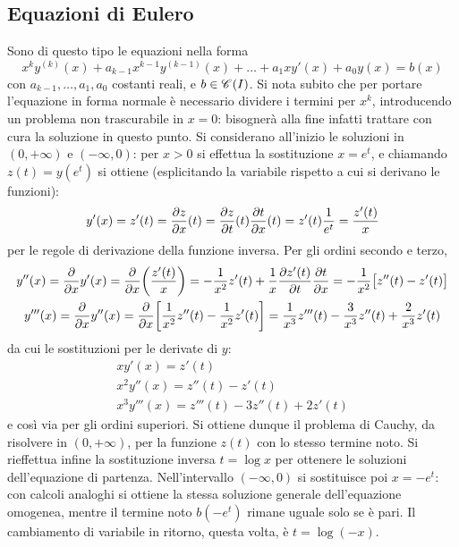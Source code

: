 \subsection*{Equazioni di Eulero}
Sono di questo tipo le equazioni nella forma
\begin{equation} \label{eq:eulero}
x^ky^{(k)}(x)+a_{k-1}x^{k-1}y^{(k-1)}(x)+\dots+a_1xy'(x)+a_0y(x)=b(x)
\end{equation}
con $a_{k-1},\dots,a_1,a_0$ costanti reali, e $b\in\mathscr C^{}(I)$.
Si nota subito che per portare l'equazione in forma normale è necessario dividere i termini per $x^k$, introducendo un problema non trascurabile in $x=0$: bisognerà alla fine infatti trattare con cura la soluzione in questo punto. Si considerano all'inizio le soluzioni in $(0,+\infty)$ e $(-\infty,0)$: per $x>0$ si effettua la sostituzione $x=e^t$, e chiamando $z(t)=y(e^t)$ si ottiene (esplicitando la variabile rispetto a cui si derivano le funzioni):
\[
y'(x)=z'(t)=\frac{\partial {z}}{\partial {x}}(t)=\frac{\partial {z}}{\partial {t}}(t)\frac{\partial {t}}{\partial {x}}(t)=z'(t)\frac1{e^t}=\frac{z'(t)}{x}
\]
per le regole di derivazione della funzione inversa.
Per gli ordini secondo e terzo,
\begin{gather*}
y''(x)=\frac{\partial {}}{\partial {x}}y'(x)=\frac{\partial {}}{\partial {x}}\bigg(\frac{z'(t)}{x}\bigg)=-\frac1{x^2}z'(t)+\frac1{x}\frac{\partial {z'(t)}}{\partial {t}}\frac{\partial {t}}{\partial {x}}=-\frac1{x^2}\big[z''(t)-z'(t)\big]\\
y'''(x)=\frac{\partial {}}{\partial {x}}y''(x)=\frac{\partial {}}{\partial {x}}\bigg[\frac1{x^2}z''(t)-\frac1{x^2}z'(t)\bigg]=\frac1{x^3}z'''(t)-\frac3{x^3}z''(t)+\frac2{x^3}z'(t)
\end{gather*}
da cui le sostituzioni per le derivate di $y$:
\begin{equation} \label{eq:sostituzioni_eulero}
\begin{gathered}
xy'(x)=z'(t)\\
x^2y''(x)=z''(t)-z'(t)\\
x^3y'''(x)=z'''(t)-3z''(t)+2z'(t)
\end{gathered}
\end{equation}
e così via per gli ordini superiori.
Si ottiene dunque il problema di Cauchy, da risolvere in $(0,+\infty)$, per la funzione $z(t)$ con lo stesso termine noto. Si rieffettua infine la sostituzione inversa $t=\log x$ per ottenere le soluzioni dell'equazione di partenza.
Nell'intervallo $(-\infty,0)$ si sostituisce poi $x=-e^t$: con calcoli analoghi si ottiene la stessa soluzione generale dell'equazione omogenea, mentre il termine noto $b(-e^t)$ rimane uguale solo se è pari. Il cambiamento di variabile in ritorno, questa volta, è $t=\log(-x)$.

